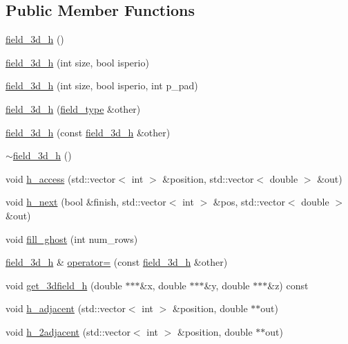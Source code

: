 \subsection*{Public Member Functions}
\begin{DoxyCompactItemize}
\item 
\hyperlink{classfield__3d__h_ab4075a1ea58d9dfba6593634fc82b581}{field\+\_\+3d\+\_\+h} ()
\item 
\hyperlink{classfield__3d__h_abeec2e1a4d0fa1e38677acb8e459a4e6}{field\+\_\+3d\+\_\+h} (int size, bool isperio)
\item 
\hyperlink{classfield__3d__h_a8f520edb96a4be3b2346b5d6f5fd1799}{field\+\_\+3d\+\_\+h} (int size, bool isperio, int p\+\_\+pad)
\item 
\hyperlink{classfield__3d__h_a3a527e3d3847d7d43d4740c291a558c4}{field\+\_\+3d\+\_\+h} (\hyperlink{classfield__type}{field\+\_\+type} \&other)
\item 
\hyperlink{classfield__3d__h_a57b5974d6f1b3fc85bb8a063224c61e7}{field\+\_\+3d\+\_\+h} (const \hyperlink{classfield__3d__h}{field\+\_\+3d\+\_\+h} \&other)
\item 
\hyperlink{classfield__3d__h_a50fc7168e6083674703fa177e736efe1}{$\sim$field\+\_\+3d\+\_\+h} ()
\item 
void \hyperlink{classfield__3d__h_a2bf31b5938e68787979c41af562cef0e}{h\+\_\+access} (std\+::vector$<$ int $>$ \&position, std\+::vector$<$ double $>$ \&out)
\item 
void \hyperlink{classfield__3d__h_a48336ddd5b0e036bde1db2c324b830bf}{h\+\_\+next} (bool \&finish, std\+::vector$<$ int $>$ \&pos, std\+::vector$<$ double $>$ \&out)
\item 
void \hyperlink{classfield__3d__h_a1591db771816e1dd5b9971463cd14988}{fill\+\_\+ghost} (int num\+\_\+rows)
\item 
\hyperlink{classfield__3d__h}{field\+\_\+3d\+\_\+h} \& \hyperlink{classfield__3d__h_adf1f7a69955404d0ed6a9b647e176d34}{operator=} (const \hyperlink{classfield__3d__h}{field\+\_\+3d\+\_\+h} \&other)
\item 
void \hyperlink{classfield__3d__h_ae28101f8213ae939766b611c2c8116d2}{get\+\_\+3dfield\+\_\+h} (double $\ast$$\ast$$\ast$\&x, double $\ast$$\ast$$\ast$\&y, double $\ast$$\ast$$\ast$\&z) const 
\item 
void \hyperlink{classfield__3d__h_a9ff4a061c1f2c293e1ab8775df1fec1f}{h\+\_\+adjacent} (std\+::vector$<$ int $>$ \&position, double $\ast$$\ast$out)
\item 
void \hyperlink{classfield__3d__h_a0fc4bbb10cd843962516134a199d65a7}{h\+\_\+2adjacent} (std\+::vector$<$ int $>$ \&position, double $\ast$$\ast$out)

\end{DoxyCompactItemize}
